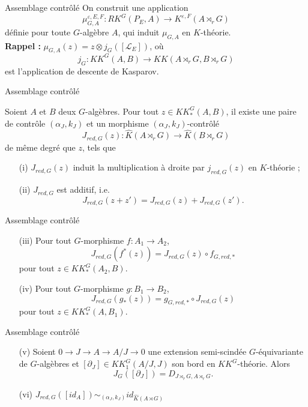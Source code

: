 \begin{frame}{Assemblage contrôlé}
On construit une application 
\[\mu_{G,A}^{\varepsilon, E,F} : RK^G(P_E,A) \rightarrow K^{\varepsilon, F}(A \rtimes_r G)\]
définie pour toute $G$-algèbre $A$, qui induit $\mu_{G,A}$ en $K$-théorie. \\ %
\vspace{0.3 cm}
\textbf{Rappel :} $\mu_{G,A}(z) = z\otimes j_G([\mathcal L_E])$, où
\[j_G : KK^G(A,B)\rightarrow KK(A\rtimes_r G, B\rtimes_r G)\]
est l'application de descente de Kasparov.
\end{frame}

\begin{frame}{Assemblage contrôlé}
\begin{propfr}
Soient $A$ et $B$ deux $G$-algèbres. Pour tout $z\in KK^G_*(A,B)$, il existe une paire de contrôle $(\alpha_J,k_J)$ et un morphisme $(\alpha_J,k_J)$-contrôlé
\[J_{red,G}(z) : \hat K(A\rtimes_r G)\rightarrow \hat K(B\rtimes_r G)\]
de même degré que $z$, tels que
\begin{enumerate}
\item[(i)] $J_{red,G}(z)$ induit la multiplication à droite par $j_{red,G}(z)$ en $K$-théorie ;
\item[(ii)] $J_{red,G}$ est additif, i.e.
\[J_{red,G}(z+z')=J_{red,G}(z)+J_{red,G}(z').\]
\end{enumerate}
\end{propfr}
\end{frame}

\begin{frame}{Assemblage contrôlé}
\begin{propfr}[suite]
\begin{enumerate}
\item[(iii)] Pour tout $G$-morphisme $f : A_1\rightarrow A_2$,
\[J_{red,G}(f^*(z))=J_{red,G}(z)\circ f_{G,red,*}\] pour tout $z\in KK_*^G(A_2,B)$.
\item[(iv)] Pour tout $G$-morphisme $g : B_1\rightarrow B_2$,
\[J_{red,G}(g_*(z))= g_{G,red,*}\circ J_{red,G}(z)\] pour tout $z\in KK_*^G(A,B_1)$.
\end{enumerate}
\end{propfr}
\end{frame}

\begin{frame}{Assemblage contrôlé}
\begin{propfr}[suite]
\begin{enumerate}
\item[(v)] Soient $0\rightarrow J\rightarrow A\rightarrow A/J\rightarrow 0$ une extension semi-scindée $G$-équivariante de $G$-algèbres et  $[\partial_J]\in KK_1^G(A/J,J)$ son bord en $KK^G$-théorie. Alors 
\[J_G([\partial_J])=D_{J\rtimes_r G,A\rtimes_rG}.\] 
\item[(vi)] $J_{red,G}([id_A]) \sim_{(\alpha_J,k_J)} id_{\hat K(A\rtimes G)}$
\end{enumerate}
\end{propfr}
\end{frame}

